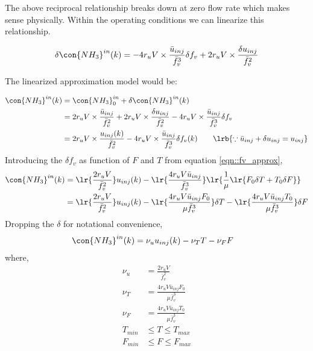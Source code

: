 The above reciprocal relationship breaks down at zero flow rate which makes sense physically. Within the operating conditions we can linearize this relationship.

\begin{align*}
    \delta  \con{NH_3}^{in} (k) &= -4r_u V \times \frac{\bar u_{inj}}{\bar{f}_v^3} \delta f_v
                                   + 2r_u V \times \frac{\delta u_{inj}}{\bar f_v^2}\\
\end{align*}

The linearized approximation model would be:

\begin{align*}
    \con{NH_3}^{in}(k) &= \con{NH_3}^{in}_0 + \delta \con{NH_3}^{in} (k)\\
                       &= 2r_u V \times \frac{\bar u_{inj}}{ \bar f_v^2}
                         + 2r_u V \times \frac{\delta u_{inj}}{\bar f_v^2}
                         -4r_u V \times \frac{\bar u_{inj}}{\bar{f}_v^3} \delta f_v\\
                       &= 2r_u V \times \frac{u_{inj}(k)}{ \bar f_v^2}
                         -4r_u V \times \frac{\bar u_{inj}}{\bar{f}_v^3} \delta f_v(k)
                         \qquad \lrb{\because \bar u_{inj} + \delta u_{inj} = u_{inj}}
\end{align*}
Introducing the $\delta f_v$ as function of $F$ and $T$ from equation \ref{eqn::fv_approx},
\begin{align*}
    \con{NH_3}^{in}(k) &= \lr{\frac{2r_u V}{\bar f_v^2}} u_{inj}(k)
                          -\lr{\frac{ 4r_u V \bar u_{inj}}{\bar{f}_v^3}}\lr{\frac{1}{\mu} \lr{F_0 \delta T + T_0 \delta F} } \\
                       &= \lr{\frac{2r_u V}{\bar f_v^2}} u_{inj}(k)
                          -\lr{\frac{ 4r_u V \bar u_{inj} F_0 }{\mu \bar{f}_v^3}} \delta T
                          -\lr{\frac{ 4r_u V \bar u_{inj} T_0 }{\mu \bar{f}_v^3}} \delta F
\end{align*}
Dropping the $\delta$ for notational convenience,
\begin{align}
    \con{NH_3}^{in}(k) &= \nu_u u_{inj}(k) - \nu_T T - \nu_F F      \label{eqn::urea_inj}
\end{align}
where,
\begin{align*}
    \nu_u &= \frac{2r_u V}{\bar f_v^2}\\
    \nu_T &= \frac{ 4r_u V \bar u_{inj} F_0 }{\mu \bar{f}_v^3}\\
    \nu_F &= \frac{ 4r_u V \bar u_{inj} T_0 }{\mu \bar{f}_v^3}\\
    T_{min} &\leq T \leq T_{max}\\
    F_{min} &\leq F \leq F_{max}
\end{align*}
